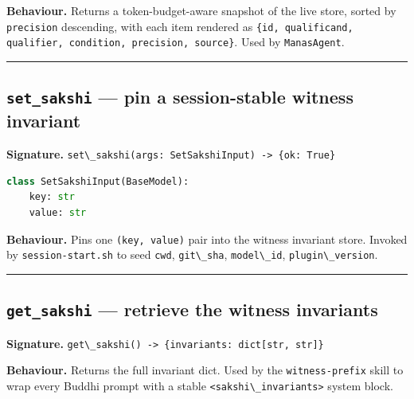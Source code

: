 \textbf{Behaviour.} Returns a token-budget-aware snapshot of the live store, sorted by \passthrough{\lstinline!precision!} descending, with each item rendered as \passthrough{\lstinline!\{id, qualificand, qualifier, condition, precision, source\}!}. Used by \passthrough{\lstinline!ManasAgent!}.

\begin{center}\rule{0.5\linewidth}{0.5pt}\end{center}

\subsection{\texorpdfstring{\texttt{set\_sakshi} --- pin a session-stable witness invariant}{set\_sakshi --- pin a session-stable witness invariant}}\label{set_sakshi-pin-a-session-stable-witness-invariant}

\textbf{Signature.} \passthrough{\lstinline!set\_sakshi(args: SetSakshiInput) -> \{ok: True\}!}

\begin{lstlisting}[language=Python]
class SetSakshiInput(BaseModel):
    key: str
    value: str
\end{lstlisting}

\textbf{Behaviour.} Pins one \passthrough{\lstinline!(key, value)!} pair into the witness invariant store. Invoked by \passthrough{\lstinline!session-start.sh!} to seed \passthrough{\lstinline!cwd!}, \passthrough{\lstinline!git\_sha!}, \passthrough{\lstinline!model\_id!}, \passthrough{\lstinline!plugin\_version!}.

\begin{center}\rule{0.5\linewidth}{0.5pt}\end{center}

\subsection{\texorpdfstring{\texttt{get\_sakshi} --- retrieve the witness invariants}{get\_sakshi --- retrieve the witness invariants}}\label{get_sakshi-retrieve-the-witness-invariants}

\textbf{Signature.} \passthrough{\lstinline!get\_sakshi() -> \{invariants: dict[str, str]\}!}

\textbf{Behaviour.} Returns the full invariant dict. Used by the \passthrough{\lstinline!witness-prefix!} skill to wrap every Buddhi prompt with a stable \passthrough{\lstinline!<sakshi\_invariants>!} system block.

